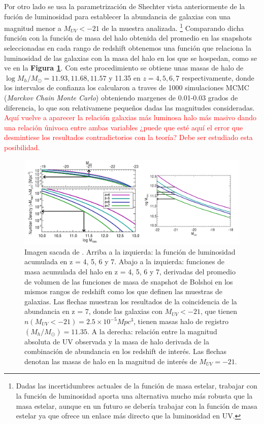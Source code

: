 \documentclass{article}
\begin{document}
Por otro lado se usa la parametrización de Shechter vista anteriormente de la fución de luminosidad para establecer la abundancia de galaxias con una magnitud menor a $M_{UV}<-21$ de la muestra analizada. \footnote{Dadas las incertidumbres actuales de la función de masa estelar, trabajar con la función de luminosidad aporta una alternativa mucho más robusta que la masa estelar, aunque en un futuro se debería trabajar con la función de masa estelar ya que ofrece un enlace más directo que la luminosidad en UV.} Comparando dicha función con la función de masa del halo obtenida del promedio en las snapshots seleccionadas en cada rango de redshift obtenemos una función que relaciona la luminosidad de las galaxias con la masa del halo en los que se hospedan, como se ve en la \textbf{Figura \ref{fig:fink1}}. Con este procedimiento se obtiene unas masas de halo de $\log M_h/M_\odot= 11.93, 11.68, 11.57$ y 11.35 en $z=4,5,6,7$ respectivamente, donde los intervalos de confianza los calcularon a traves de 1000 simulaciones MCMC (\textit{Marckov Chain Monte Carlo}) obteniendo margenes de 0.01-0.03 grados de diferencia, lo que son relativamene pequeños dadas las magnitudes consideradas. \textcolor{red}{Aquí vuelve a aparecer la relación galaxias más luminosa halo más masivo dando una relación únivoca entre ambas variables ¿puede que esté aquí el error que desmintiese los resultados contradictorios con la teoría? Debe ser estudiado esta posibilidad.}\\
\begin{figure}[t]
    \centering
    \includegraphics[scale=0.5]{Figuras/fink_1}
    \caption{Imagen sacada de \cite{finkelstein2015increasing}. Arriba a la izquierda: la función de luminosidad acumulada en z = 4, 5, 6 y 7. Abajo a la izquierda: funciones de masa acumulada del halo en z = 4, 5, 6 y 7, derivadas del promedio de volumen de las funciones de masa de snapshot de Bolshoi en los mismos rangos de redshift como los que definen las muestras de galaxias. Las flechas muestran los resultados de la coincidencia de la abundancia  en z = 7, donde las galaxias con $M_{UV} <-21$, que tienen $n(M_{UV} <-21) = 2.5 \times 10^{-5}Mpc^3$, tienen masas halo de registro $(M_h / M_\odot) = 11.35$. A la derecha: relación entre la magnitud absoluta de UV observada y la masa de halo derivada de la combinación de abundancia en los redshift de interés. Las flechas denotan las masas de halo en la magnitud de interés de $M_{UV} = - 21$.}
    \label{fig:fink1}
\end{figure}
\end{document}
